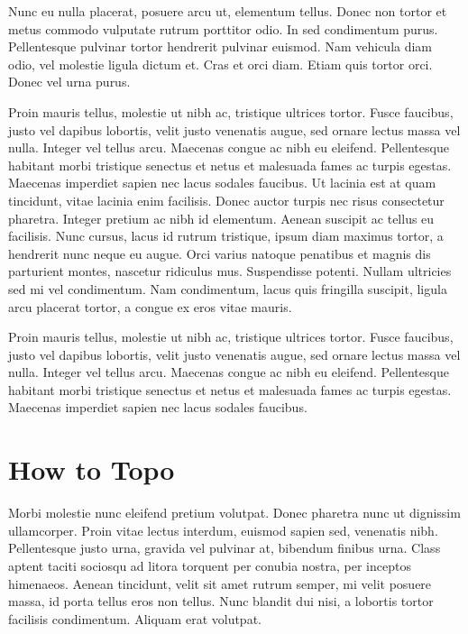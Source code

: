 Nunc eu nulla placerat, posuere arcu ut, elementum tellus. Donec non tortor et metus commodo vulputate rutrum porttitor odio. In sed condimentum purus. Pellentesque pulvinar tortor hendrerit pulvinar euismod. Nam vehicula diam odio, vel molestie ligula dictum et. Cras et orci diam. Etiam quis tortor orci. Donec vel urna purus.

Proin mauris tellus, molestie ut nibh ac, tristique ultrices tortor. Fusce faucibus, justo vel dapibus lobortis, velit justo venenatis augue, sed ornare lectus massa vel nulla. Integer vel tellus arcu. Maecenas congue ac nibh eu eleifend. Pellentesque habitant morbi tristique senectus et netus et malesuada fames ac turpis egestas. Maecenas imperdiet sapien nec lacus sodales faucibus. Ut lacinia est at quam tincidunt, vitae lacinia enim facilisis. Donec auctor turpis nec risus consectetur pharetra. Integer pretium ac nibh id elementum. Aenean suscipit ac tellus eu facilisis. Nunc cursus, lacus id rutrum tristique, ipsum diam maximus tortor, a hendrerit nunc neque eu augue. Orci varius natoque penatibus et magnis dis parturient montes, nascetur ridiculus mus. Suspendisse potenti. Nullam ultricies sed mi vel condimentum. Nam condimentum, lacus quis fringilla suscipit, ligula arcu placerat tortor, a congue ex eros vitae mauris.

Proin mauris tellus, molestie ut nibh ac, tristique ultrices tortor. Fusce faucibus, justo vel dapibus lobortis, velit justo venenatis augue, sed ornare lectus massa vel nulla. Integer vel tellus arcu. Maecenas congue ac nibh eu eleifend. Pellentesque habitant morbi tristique senectus et netus et malesuada fames ac turpis egestas. Maecenas imperdiet sapien nec lacus sodales faucibus.




\section{How to Topo}

Morbi molestie nunc eleifend pretium volutpat. Donec pharetra nunc ut dignissim ullamcorper. Proin vitae lectus interdum, euismod sapien sed, venenatis nibh. Pellentesque justo urna, gravida vel pulvinar at, bibendum finibus urna. Class aptent taciti sociosqu ad litora torquent per conubia nostra, per inceptos himenaeos. Aenean tincidunt, velit sit amet rutrum semper, mi velit posuere massa, id porta tellus eros non tellus. Nunc blandit dui nisi, a lobortis tortor facilisis condimentum. Aliquam erat volutpat.


